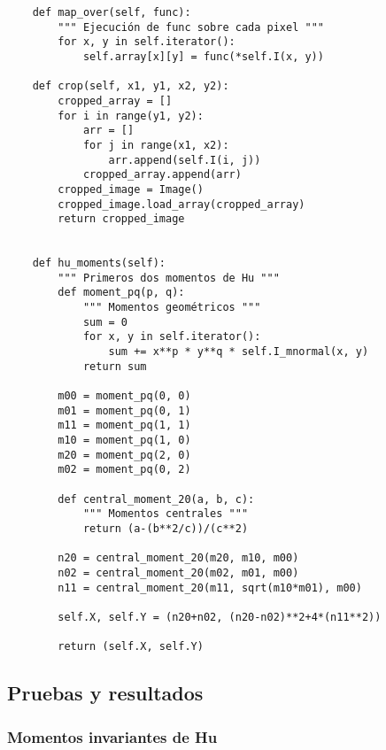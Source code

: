 \documentclass[letter]{article}
\begin{document}
\begin{verbatim}
    def map_over(self, func):
        """ Ejecución de func sobre cada pixel """
        for x, y in self.iterator():
            self.array[x][y] = func(*self.I(x, y))

    def crop(self, x1, y1, x2, y2):
        cropped_array = []
        for i in range(y1, y2):
            arr = []
            for j in range(x1, x2):
                arr.append(self.I(i, j))
            cropped_array.append(arr)
        cropped_image = Image()
        cropped_image.load_array(cropped_array)
        return cropped_image


    def hu_moments(self):
        """ Primeros dos momentos de Hu """
        def moment_pq(p, q):
            """ Momentos geométricos """
            sum = 0
            for x, y in self.iterator():
                sum += x**p * y**q * self.I_mnormal(x, y)
            return sum

        m00 = moment_pq(0, 0)
        m01 = moment_pq(0, 1)
        m11 = moment_pq(1, 1)
        m10 = moment_pq(1, 0)
        m20 = moment_pq(2, 0)
        m02 = moment_pq(0, 2)

        def central_moment_20(a, b, c):
            """ Momentos centrales """
            return (a-(b**2/c))/(c**2)

        n20 = central_moment_20(m20, m10, m00)
        n02 = central_moment_20(m02, m01, m00)
        n11 = central_moment_20(m11, sqrt(m10*m01), m00)

        self.X, self.Y = (n20+n02, (n20-n02)**2+4*(n11**2))

        return (self.X, self.Y)
\end{verbatim}
\subsection{Pruebas y resultados}
\label{sec:orgcb90e5e}
\subsubsection{Momentos invariantes de Hu}
\label{sec:org5df4b41}
\end{document}
